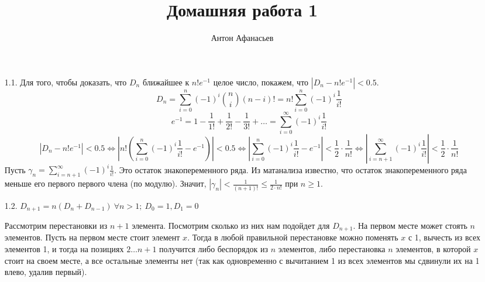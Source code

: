 \documentclass[10pt]{article}
\begin{document}
\title{Домашняя работа 1}
\author{Антон Афанасьев}
\maketitle

\begin{enumerate}
\item[1.1.] Для того, чтобы доказать, что $D_n$ ближайшее к $n!e^{-1}$ целое число, покажем, что $|D_n - n!e^{-1}| < 0.5$.
$$D_n = \sum_{i=0}^n (-1)^i \binom{n}{i} (n-i)! = n! \sum_{i=0}^n (-1)^i \frac{1}{i!}$$
$$e^{-1} = 1 - \frac{1}{1!} + \frac{1}{2!} - \frac{1}{3!} + \ldots = \sum_{i=0}^\infty (-1)^i \frac{1}{i!}$$
$$\left | D_n - n!e^{-1} \right | < 0.5 \Leftrightarrow 
\left |n! \left ( \sum_{i=0}^n (-1)^i \frac{1}{i!} - e^{-1} \right ) \right | < 0.5 \Leftrightarrow
\left |\sum_{i=0}^n (-1)^i \frac{1}{i!} - e^{-1} \right | < \frac{1}{2} \cdot \frac{1}{n!} \Leftrightarrow
\left |\sum_{i=n+1}^\infty (-1)^i \frac{1}{i!} \right | < \frac{1}{2} \cdot \frac{1}{n!}
$$
Пусть $\gamma_n = \sum_{i=n+1}^\infty (-1)^i \frac{1}{i!}$. Это остаток знакопеременного ряда. Из матанализа известно, что остаток знакопеременного ряда меньше его первого первого члена (по модулю). Значит, $|\gamma_n| < \frac{1}{(n+1)!} \le \frac{1}{2 \cdot n!}$ при $n \ge 1$. 

\item[1.2.] $D_{n+1} = n ( D_n + D_{n-1})\ \forall n > 1;\ D_0 = 1, D_1 = 0$

Рассмотрим перестановки из $n+1$ элемента. Посмотрим сколько из них нам подойдет для $D_{n+1}$. На первом месте может стоять $n$ элементов. Пусть на первом месте стоит элемент $x$. Тогда в любой правильной перестановке можно поменять $x$ с 1, вычесть из всех элементов 1, и тогда на позициях $2 \ldots n+1$ получится либо беспорядок из $n$ элементов, либо перестановка $n$ элементов, в которой $x$ стоит на своем месте, а все остальные элементы нет (так как одновременно с вычитанием 1 из всех элементов мы сдвинули их на 1 влево, удалив первый).


\end{enumerate}
\end{document}
